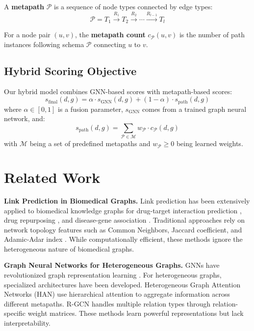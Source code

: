 \documentclass[11pt]{article}
\newcommand{\set}[1]{\mathcal{#1}}
\begin{document}
A \textbf{metapath} $\set{P}$ is a sequence of node types connected by edge types:
\begin{equation}
    \set{P} = T_1 \xrightarrow{R_1} T_2 \xrightarrow{R_2} \cdots \xrightarrow{R_{l-1}} T_l
\end{equation}

For a node pair $(u, v)$, the \textbf{metapath count} $c_\set{P}(u, v)$ is the number of path instances following schema $\set{P}$ connecting $u$ to $v$.

\subsection{Hybrid Scoring Objective}

Our hybrid model combines GNN-based scores with metapath-based scores:
\begin{equation}
    s_{\text{final}}(d, g) = \alpha \cdot s_{\text{GNN}}(d, g) + (1 - \alpha) \cdot s_{\text{path}}(d, g)
    \label{eq:hybrid}
\end{equation}
where $\alpha \in [0, 1]$ is a fusion parameter, $s_{\text{GNN}}$ comes from a trained graph neural network, and:
\begin{equation}
    s_{\text{path}}(d, g) = \sum_{\set{P} \in \set{M}} w_\set{P} \cdot c_\set{P}(d, g)
    \label{eq:path_score}
\end{equation}
with $\set{M}$ being a set of predefined metapaths and $w_\set{P} \geq 0$ being learned weights.

\section{Related Work}
\label{sec:related}

\textbf{Link Prediction in Biomedical Graphs.}
Link prediction has been extensively applied to biomedical knowledge graphs for drug-target interaction prediction \citep{zitnik2018modeling}, drug repurposing \citep{himmelstein2017systematic}, and disease-gene association \citep{peng2021gene}. Traditional approaches rely on network topology features such as Common Neighbors, Jaccard coefficient, and Adamic-Adar index \citep{liben2003link}. While computationally efficient, these methods ignore the heterogeneous nature of biomedical graphs.

\textbf{Graph Neural Networks for Heterogeneous Graphs.}
GNNs have revolutionized graph representation learning \citep{kipf2016semi, hamilton2017inductive}. For heterogeneous graphs, specialized architectures have been developed. Heterogeneous Graph Attention Networks (HAN) \citep{wang2019heterogeneous} use hierarchical attention to aggregate information across different metapaths. R-GCN \citep{schlichtkrull2018modeling} handles multiple relation types through relation-specific weight matrices. These methods learn powerful representations but lack interpretability.
\end{document}
